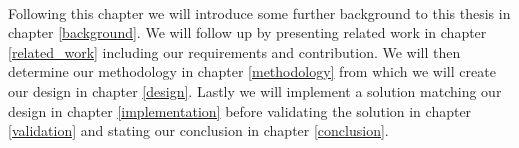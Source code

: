 \paragraph{} Following this chapter we will introduce some further background to this thesis in chapter \ref{background}. We will follow up by presenting related work in chapter \ref{related_work} including our requirements and contribution. We will then determine our methodology in chapter \ref{methodology} from which we will create our design in chapter \ref{design}. Lastly we will implement a solution matching our design in chapter \ref{implementation} before validating the solution in chapter \ref{validation} and stating our conclusion in chapter \ref{conclusion}.
